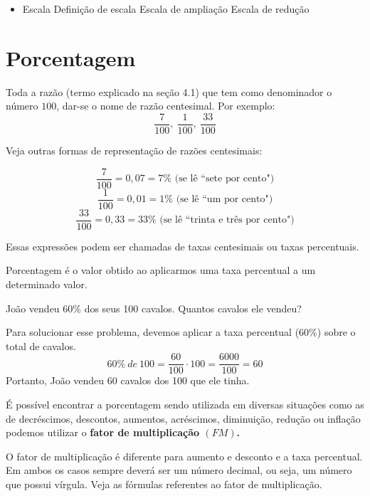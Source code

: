 	\begin{itemize}
		\item Escala
		\subitem Definição de escala 
		\subitem Escala de ampliação
		\subitem Escala de redução
	\end{itemize}

\section{Porcentagem}
Toda a razão (termo explicado na seção 4.1) que tem
como denominador o número $100$, dar-se o nome de razão centesimal. Por exemplo:
$$\frac{7}{100},~\frac{1}{100},~\frac{33}{100}$$

Veja outras formas de representação de razões centesimais:

$$\frac{7}{100}=0,07=7\% \textrm{ (se lê ``sete por cento")}$$
$$\frac{1}{100}=0,01=1\%\textrm{ (se lê ``um por cento")} $$
$$\frac{33}{100}=0,33=33\%\textrm{ (se lê ``trinta e três por cento")}$$

Essas expressões podem ser chamadas de taxas centesimais ou taxas percentuais. 

\begin{definition}
Porcentagem é o valor obtido ao aplicarmos uma taxa percentual a um determinado valor.

\end{definition}

\begin{example}
    João vendeu 60\% dos seus 100 cavalos. Quantos cavalos ele vendeu?
\end{example}

\begin{center}
    Para solucionar esse problema, devemos aplicar a taxa percentual (60\%) sobre o total de cavalos.
    $$60\%~de~100=\frac{60}{100}\cdot100=\frac{6000}{100}=60$$
    Portanto, João vendeu 60 cavalos dos 100 que ele tinha.
\end{center}

É possível encontrar a porcentagem sendo utilizada em diversas situações como as de decréscimos, descontos, aumentos, acréscimos, diminuição, redução ou inflação podemos utilizar o \textbf{fator de multiplicação $(FM)$.}

\begin{definition}
O fator de multiplicação é diferente para aumento e desconto e a taxa percentual. Em ambos os casos sempre deverá ser um número decimal, ou seja, um número que possui vírgula. Veja as fórmulas referentes ao fator de multiplicação.
\end{definition}

